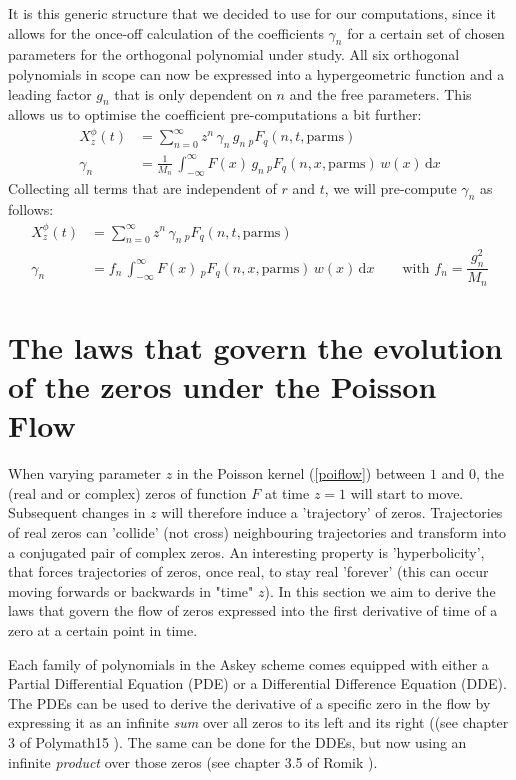 \documentclass[a4paper,11pt,twoside]{amsart}
\newcommand{\verifiedeq}{=}
\newcommand{\verifiedeq}{\stackrel{\checkmark}{=}}
\begin{document}
It is this generic structure that we decided to use for our computations, since it allows for the once-off calculation of the coefficients $\gamma_n$ for a certain set of chosen parameters for the orthogonal polynomial under study. All six orthogonal polynomials in scope can now be expressed into a hypergeometric function and a leading factor $g_n$ that is only dependent on $n$ and the free parameters. This allows us to optimise the coefficient pre-computations a bit further:
\begin{align}
 X^\phi_z(t) &\verifiedeq \sum_{n=0}^\infty z^n\,\gamma_n\,g_n\,{}_pF_q(n,t,\text{parms})\\
 \gamma_n &\verifiedeq  \frac{1}{M_n}\,\int_{-\infty}^\infty F(x)\, g_n\,{}_pF_q(n,x, \text{parms})\,w(x) \,\mathrm{d}x
\end{align} 
Collecting all terms that are independent of $r$ and $t$, we will pre-compute $\gamma_n$ as follows:
\begin{align}
 X^\phi_z(t) &\verifiedeq \sum_{n=0}^\infty z^n\,\gamma_n\,{}_pF_q(n,t, \text{parms}) \\
 \gamma_n &\verifiedeq  f_n\,\int_{-\infty}^\infty F(x)\,{}_pF_q(n,x,\text{parms})\,w(x) \,\mathrm{d}x \qquad \text{with } f_n = \dfrac{g_n^2}{M_n} 
\end{align} 
\pagebreak

\section{The laws that govern the evolution of the zeros under the Poisson Flow} \label{lawspoissonflow}
When varying parameter $z$ in the Poisson kernel (\ref{poiflow}) between $1$ and $0$, the (real and or complex) zeros of function $F$ at time $z=1$ will start to move. Subsequent changes in $z$ will therefore induce a 'trajectory' of zeros. Trajectories of real zeros can 'collide' (not cross) neighbouring trajectories and transform  into a conjugated pair of complex zeros. An interesting property is 'hyperbolicity', that forces trajectories of zeros, once real, to stay real 'forever' (this can occur moving forwards or backwards in "time" $z$). In this section we aim to derive the laws that govern the flow of zeros expressed into the first derivative of time of a zero at a certain point in time. 

Each family of polynomials in the Askey scheme comes equipped with either a Partial Differential Equation (PDE) or a Differential Difference Equation (DDE). The PDEs can be used to derive the derivative of a specific zero in the flow by expressing it as an infinite \textit{sum} over all zeros to its left and its right ((see chapter 3 of Polymath15 \cite{pol}). The same can be done for the DDEs, but now using an infinite \textit{product} over those zeros (see chapter 3.5 of Romik \cite{rom}). 
\end{document}
